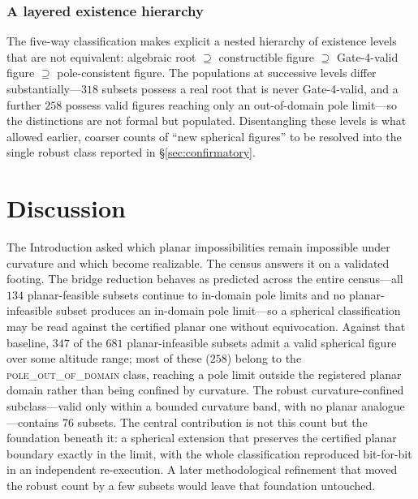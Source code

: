 \documentclass[pdflatex,sn-mathphys-num]{sn-jnl}
\theoremstyle{thmstyleone}%
\theoremstyle{thmstyletwo}%
\theoremstyle{thmstylethree}%
\begin{document}
\subsubsection{A layered existence hierarchy}
The five-way classification makes explicit a nested hierarchy of existence levels that are not equivalent: algebraic root $\supseteq$ constructible figure $\supseteq$ Gate-4-valid figure $\supseteq$ pole-consistent figure. The populations at successive levels differ substantially---$318$ subsets possess a real root that is never Gate-4-valid, and a further $258$ possess valid figures reaching only an out-of-domain pole limit---so the distinctions are not formal but populated. Disentangling these levels is what allowed earlier, coarser counts of ``new spherical figures'' to be resolved into the single robust class reported in \S\ref{sec:confirmatory}.

\section{Discussion}
\label{sec:discussion}

The Introduction asked which planar impossibilities remain impossible under curvature and which become realizable. The census answers it on a validated footing. The bridge reduction behaves as predicted across the entire census---all $134$ planar-feasible subsets continue to in-domain pole limits and no planar-infeasible subset produces an in-domain pole limit---so a spherical classification may be read against the certified planar one without equivocation. Against that baseline, $347$ of the $681$ planar-infeasible subsets admit a valid spherical figure over some altitude range; most of these ($258$) belong to the \textsc{pole\_out\_of\_domain} class, reaching a pole limit outside the registered planar domain rather than being confined by curvature. The robust curvature-confined subclass---valid only within a bounded curvature band, with no planar analogue---contains $76$ subsets. The central contribution is not this count but the foundation beneath it: a spherical extension that preserves the certified planar boundary exactly in the limit, with the whole classification reproduced bit-for-bit in an independent re-execution. A later methodological refinement that moved the robust count by a few subsets would leave that foundation untouched.
\end{document}
